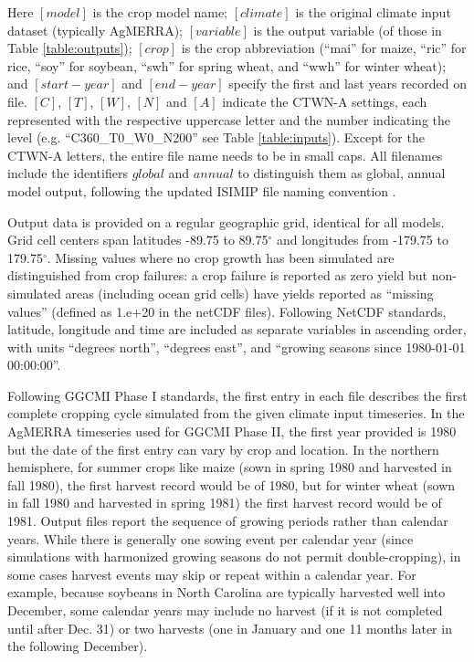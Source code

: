 \documentclass[gmd, manuscript]{copernicus} %
\begin{document}

\noindent Here $[model]$ is the crop model name; $[climate]$ is the original climate input dataset (typically AgMERRA); $[variable]$ is the output variable (of those in Table \ref{table:outputs}); $[crop]$ is the crop abbreviation (``mai'' for maize, ``ric'' for rice, ``soy'' for soybean, ``swh'' for spring wheat, and ``wwh'' for winter wheat); and $[start-year]$ and $[end-year]$ specify the first and last years recorded on file.
$[C]$, $[T]$, $[W]$, $[N]$ and $[A]$ indicate the CTWN-A settings, each represented with the respective uppercase letter and the number indicating the level (e.g. ``C360\_T0\_W0\_N200'' see Table \ref{table:inputs}). 
Except for the CTWN-A letters, the entire file name needs to be in small caps. 
All filenames include the identifiers $global$ and $annual$ to distinguish them as global, annual model output, following the updated ISIMIP file naming convention \citep{frieler2017assessing}.

Output data is provided on a regular geographic grid, identical for all models. 
Grid cell centers span latitudes -89.75 to 89.75$^{\circ}$ and longitudes from -179.75 to 179.75$^{\circ}$. 
Missing values where no crop growth has been simulated are distinguished from crop failures: a crop failure is reported as zero yield but non-simulated areas (including ocean grid cells) have yields reported as ``missing values'' (defined as 1.e+20 in the netCDF files). 
Following NetCDF standards, latitude, longitude and time are included as separate variables in ascending order, with
units ``degrees north'', ``degrees east'', and ``growing seasons since 1980-01-01 00:00:00''. 

Following GGCMI Phase I standards, the first entry in each file describes the first complete cropping cycle simulated from the given climate input timeseries. 
In the AgMERRA timeseries used for GGCMI Phase II, the first year provided is 1980 but the date of the first entry can vary by crop and location. 
In the northern hemisphere, for summer crops like maize (sown in spring 1980 and harvested in fall 1980), the first harvest record would be of 1980, but for winter wheat (sown in fall 1980 and harvested in spring 1981) the first harvest record would be of 1981. Output files report the sequence of growing periods rather than calendar years. 
While there is generally one sowing event per calendar year (since simulations with harmonized growing seasons do not permit double-cropping), in some cases harvest events may skip or repeat within a calendar year.
For example, because soybeans in North Carolina are typically harvested well into December, some calendar years may include no harvest (if it is not completed until after Dec. 31) or two harvests (one in January and one 11 months later in the following December). 
\end{document}
